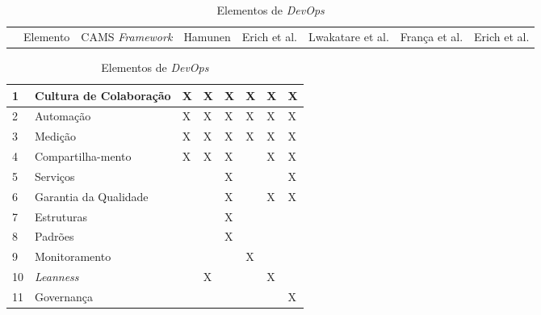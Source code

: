 \begin{table}[hb!]
\centering
\caption{Elementos de \textit{DevOps}}
\label{tabela_elementos_devops}
\begin{tabular}{|p{0.3cm}|p{2.7cm}|p{2cm}|p{1.55cm}|p{1.35cm}|p{1.7cm}|p{1.35cm}|p{1.45cm}|}
\hline

& Elemento & \acrshort{CAMS} \textit{Framework} \cite{what_devops_means_2010} & Hamunen \cite{challenges_in_adopting_devops} & Erich et al. \cite{cooperation_dev_ops_esem_2014} & Lwakatare et al. \cite{extending_dimensions} & França et al. \cite{characterizing_devops} & Erich et al. \cite{qualitative_devops_journalsw_17} \\
\end{tabular}

\begin{tabular}{|p{0.3cm}|p{2.7cm}|p{2cm}|p{1.55cm}|p{1.35cm}|p{1.7cm}|p{1.35cm}|p{1.45cm}|}

\hline

1  & Cultura de Colaboração & X & X & X & X & X & X \\

\hline

2  & Automação              & X & X & X & X & X & X \\

\hline

3  & Medição                & X & X & X & X & X & X \\

\hline

4  & Compartilha-\newline mento & X & X & X &    & X & X \\

\hline

5  & Serviços               & & & X &        &        & X \\

\hline

6  & Garantia da Qualidade  & & & X &        & X & X \\

\hline

7  & Estruturas             & & & X &        &        &        \\

\hline

8  & Padrões                & & & X &        &        &        \\

\hline

9  & Monitoramento          & & &        & X &        &        \\

\hline

10 & \textit{Leanness} & & X & & & X & \\

\hline
11 & Governança             & & &        &        &        & X \\

\hline

\end{tabular}
\end{table}

